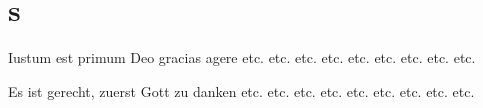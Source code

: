 \documentclass{book}
\begin{document}
\section{s}




\begin{pairs}

\begin{Leftside}
\beginnumbering
\pstart

Iustum est primum Deo gracias agere etc. etc. etc. etc. etc. etc. etc. etc. etc. 
\pend
\endnumbering
\end{Leftside}

\begin{Rightside}
\beginnumbering
\pstart
Es ist gerecht, zuerst Gott zu danken etc. etc. etc. etc. etc. etc. etc. etc. etc. 
\pend
\endnumbering
\end{Rightside}

\end{pairs}
\Columns
\end{document}
